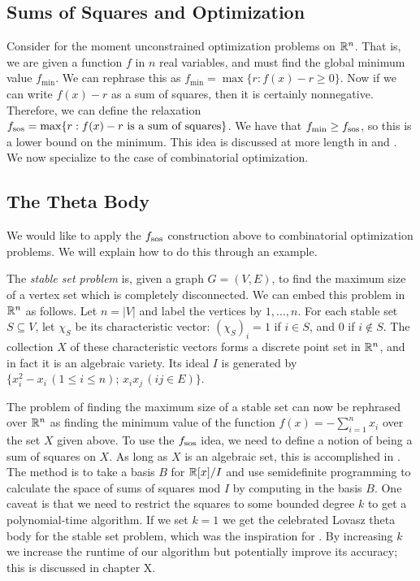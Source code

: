 \subsection{Sums of Squares and Optimization}
Consider for the moment unconstrained optimization problems on $\mathbb{R}^n$. That 
is, we are given a function $f$ in $n$ real variables, and must find the 
global minimum value $f_{\min}$. We can rephrase this as $f_{\min} = 
\max \{r: f(x) - r \ge 0\}$. Now if we can write $f(x) - r$ as a sum of squares,
then it is certainly nonnegative. Therefore, we can define the relaxation
$f_{\textup{sos}} = \max \{r: f(x) - r \textup{ is a sum of squares}\}$.
We have that $f_{\min} \ge f_{\textup{sos}}$, so this is a lower bound on
the minimum. This idea is discussed at more length in \cite{sostools} and 
\cite{lasserre}. We now specialize to the case of combinatorial optimization.

\subsection{The Theta Body}
We would like to apply the $f_{\textup{sos}}$ construction above to
combinatorial optimization problems. We will explain how to do this through
an example.

The {\em stable set problem} is, given a graph $G = (V,E)$, to find the
maximum size of a vertex set which is completely disconnected. We can embed
this problem in $\mathbb{R}^n$ as follows. Let $n = |V|$ and label the vertices by 
$1, \ldots, n$. For each stable set $S \subseteq V$, let $\chi_S$ be its 
characteristic vector: $(\chi_S)_i = 1$ if $i \in S$, and 0 if $i \notin S$.
The collection $X$ of these characteristic vectors forms a discrete point set
in $\mathbb{R}^n$, and in fact it is an algebraic variety. Its ideal
$I$ is generated by $\{x_i^2 - x_i \, (1\le i \le n);\, x_ix_j\, (ij \in E) \}$.

The problem of finding the maximum size of a stable set can now be rephrased
over $\mathbb{R}^n$ as finding the minimum value of the function
$f(x) = - \sum_{i=1}^n x_i$ over the set $X$ given above. To use the
$f_{\textup{sos}}$ idea, we need to define a notion of being a sum of squares
on $X$. As long as $X$ is an algebraic set, this is accomplished in 
\cite{glpt}. The method is to take a basis $B$ for $\mathbb{R}[x]/I$ and use 
semidefinite programming to calculate the space of sums of squares mod $I$ by
computing in the basis $B$. One caveat is that we need to restrict the 
squares to some bounded degree $k$ to get a polynomial-time algorithm. If
we set $k=1$ we get the celebrated Lovasz theta body for the stable set
problem, which was the inspiration for \cite{glpt}. By increasing $k$ we
increase the runtime of our algorithm but potentially improve its accuracy;
this is discussed in chapter X. 

